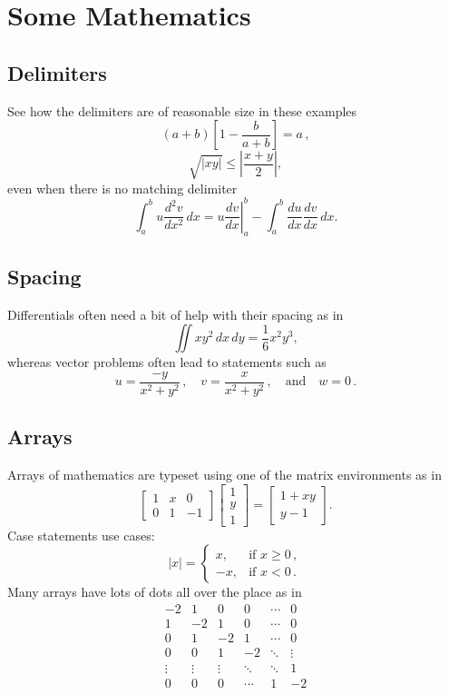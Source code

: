 \documentclass[9pt]{memoir}
\begin{document}

\section{Some Mathematics}

\subsection{Delimiters}

See how the delimiters are of reasonable size in these examples
\[
	\left(a+b\right)\left[1-\frac{b}{a+b}\right]=a\,,
\]
\[
	\sqrt{|xy|}\leq\left|\frac{x+y}{2}\right|,
\]
even when there is no matching delimiter
\[
	\int_a^bu\frac{d^2v}{dx^2}\,dx
	=\left.u\frac{dv}{dx}\right|_a^b
	-\int_a^b\frac{du}{dx}\frac{dv}{dx}\,dx.
\]

\subsection{Spacing}

Differentials often need a bit of help with their spacing as in
\[
	\iint xy^2\,dx\,dy 
	=\frac{1}{6}x^2y^3,
\]
whereas vector problems often lead to statements such as
\[
	u=\frac{-y}{x^2+y^2}\,,\quad
	v=\frac{x}{x^2+y^2}\,,\quad\text{and}\quad
	w=0\,.
\]

\subsection{Arrays}

Arrays of mathematics are typeset using one of the matrix environments as 
in
\[
	\begin{bmatrix}
		1 & x & 0 \\
		0 & 1 & -1
	\end{bmatrix}\begin{bmatrix}
		1  \\
		y  \\
		1
	\end{bmatrix}
	=\begin{bmatrix}
		1+xy  \\
		y-1
	\end{bmatrix}.
\]
Case statements use cases:
\[
	|x|=\begin{cases}
		x, & \text{if }x\geq 0\,,  \\
		-x, & \text{if }x< 0\,.
	\end{cases}
\]
Many arrays have lots of dots all over the place as in
\[
	\begin{matrix}
		-2 & 1 & 0 & 0 & \cdots & 0  \\
		1 & -2 & 1 & 0 & \cdots & 0  \\
		0 & 1 & -2 & 1 & \cdots & 0  \\
		0 & 0 & 1 & -2 & \ddots & \vdots \\
		\vdots & \vdots & \vdots & \ddots & \ddots & 1  \\
		0 & 0 & 0 & \cdots & 1 & -2
	\end{matrix}
\]
\end{document}
